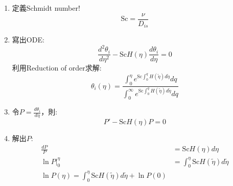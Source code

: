 \documentclass[../main.tex]{subfiles}
\begin{document}
\begin{itemize}
\begin{enumerate}
\begin{equation}
      v_z(z)\frac{d\theta_i}{dz}=D_{is}\frac{d^2\theta_i}{dz^2}
    \end{equation}
    邊界條件改為:
    \begin{align}
      \theta_i(\infty) &= 1\\
      \theta_i(0) &=0
    \end{align}
    代入uniforming accessible的$v_z(z)$:
    \begin{equation}
      v_z(z)= \sqrt{\nu\omega} H(\eta), \quad \eta = z\sqrt{\frac{\omega}{\nu}}, \quad
      d\eta = dz\sqrt{\frac{\omega}{\nu}}
    \end{equation}
    代入後:
    \begin{equation}
      \sqrt{\nu\omega}H(\eta)\sqrt{\frac{\omega}{\nu}}\frac{d\theta_i}{d\eta} 
      = D_{is}\frac{\omega}{\nu}\frac{d^2\theta_i}{d\eta^2}
    \end{equation}
    移項:
    \begin{equation}
      H(\eta)\frac{d\theta_i}{d\eta} = \frac{D_{is}}{\nu}\frac{d^2\theta_i}{d\eta^2}
    \end{equation}
    \item 定義Schmidt number!
    \begin{equation}
      \text{Sc} = \frac{\nu}{D_{is}}
    \end{equation}
    \item 寫出ODE:
    \begin{equation}
      \frac{d^2\theta_i}{d\eta^2} - \text{Sc} H(\eta)\frac{d\theta_i}{d\eta} = 0
    \end{equation}
    利用Reduction of order求解:
    \begin{equation}
      \theta_i(\eta) = \frac{
        \int_0^\eta e^{\text{Sc}\int_0^q H(\tilde\eta)d\tilde\eta}dq
      }{
        \int_0^\infty e^{\text{Sc}\int_0^q H(\tilde\eta)d\tilde\eta}dq
      }
    \end{equation}
    \item 令$P = \frac{d\theta_i}{d\eta}$，則:
    \begin{equation}
      P' - \text{Sc} H(\eta) P = 0
    \end{equation}
    \item 解出$P$:
    \begin{align}
      \frac{dP}{P} &=\text{Sc}H(\eta)d\eta\\
      \ln P\big|_0^\eta &= \int_0^\eta \text{Sc}H(\tilde \eta)d\tilde\eta\\
      \ln P(\eta) = \int_0^\eta \text{Sc}H(\tilde \eta)d\tilde\eta + \ln P(0)\\

\end{align}
\end{enumerate}
\end{itemize}
\end{document}
